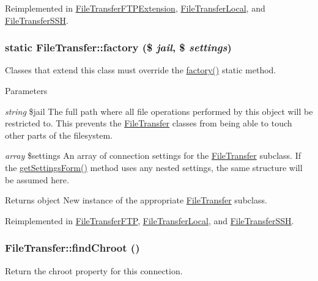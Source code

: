 Reimplemented in \hyperlink{classFileTransferFTPExtension_af1114a1f88335b964727c9ac73cc7a27}{FileTransferFTPExtension}, \hyperlink{classFileTransferLocal_aa578801cec3774f44a51d6b33cd5b1fd}{FileTransferLocal}, and \hyperlink{classFileTransferSSH_a4a36f6ce422bebc58aca5fe3b8a00d06}{FileTransferSSH}.\hypertarget{classFileTransfer_aed740d2f6e0780134b2b29a174ad05f2}{
\subsubsection[{factory}]{\setlength{\rightskip}{0pt plus 5cm}static FileTransfer::factory (\$ {\em jail}, \/  \$ {\em settings})}}
\label{classFileTransfer_aed740d2f6e0780134b2b29a174ad05f2}
Classes that extend this class must override the \hyperlink{classFileTransfer_aed740d2f6e0780134b2b29a174ad05f2}{factory()} static method.


\begin{DoxyParams}{Parameters}
\item[{\em string}]\$jail The full path where all file operations performed by this object will be restricted to. This prevents the \hyperlink{classFileTransfer}{FileTransfer} classes from being able to touch other parts of the filesystem. \item[{\em array}]\$settings An array of connection settings for the \hyperlink{classFileTransfer}{FileTransfer} subclass. If the \hyperlink{classFileTransfer_a3b5e843b16814bdbe43dfecda17bae33}{getSettingsForm()} method uses any nested settings, the same structure will be assumed here. \end{DoxyParams}
\begin{DoxyReturn}{Returns}
object New instance of the appropriate \hyperlink{classFileTransfer}{FileTransfer} subclass. 
\end{DoxyReturn}


Reimplemented in \hyperlink{classFileTransferFTP_a9357dd94f01df328dc19645decdf0485}{FileTransferFTP}, \hyperlink{classFileTransferLocal_aee03476a89446c2e6fb8d9a666739bd5}{FileTransferLocal}, and \hyperlink{classFileTransferSSH_afafbb0a5ffc2799cd926f38b87ea5e41}{FileTransferSSH}.\hypertarget{classFileTransfer_aafd33ce71a2e77955e172cf6fc204b00}{
\subsubsection[{findChroot}]{\setlength{\rightskip}{0pt plus 5cm}FileTransfer::findChroot ()}}
\label{classFileTransfer_aafd33ce71a2e77955e172cf6fc204b00}
Return the chroot property for this connection.

